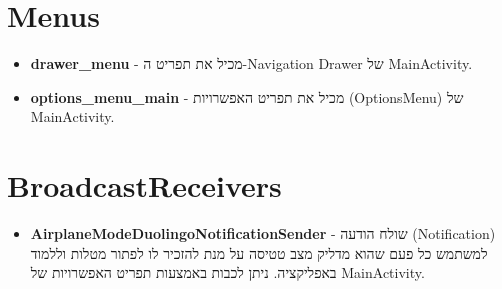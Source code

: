 \section{Menus}

\begin{itemize}
  \item \textbf{drawer\_menu} - מכיל את תפריט ה-Navigation Drawer של MainActivity.
  \item \textbf{options\_menu\_main} - מכיל את תפריט האפשרויות (OptionsMenu) של MainActivity.
\end{itemize}

\section{BroadcastReceivers}

\begin{itemize}
  \item \textbf{AirplaneModeDuolingoNotificationSender} - שולח הודעה (Notification) למשתמש כל פעם שהוא מדליק מצב טטיסה על מנת להזכיר לו לפתור מטלות וללמוד באפליקציה. ניתן לכבות באמצעות תפריט האפשרויות של MainActivity.
\end{itemize}